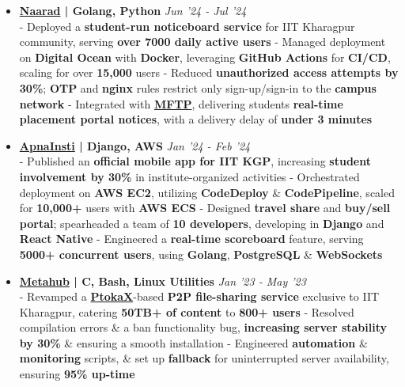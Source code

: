 \documentclass[a4paper,10pt]{extarticle} %
\begin{document}
\begin{itemize}[leftmargin=0.55cm, rightmargin=0.2cm, label={\Large\textbullet}]

 \item \textbf{\href{https://naarad.metakgp.org}{Naarad} | Golang, Python} \hfill{\textit{Jun '24 - Jul '24}} \\
- Deployed a \textbf{student-run noticeboard service} for IIT Kharagpur community, serving \textbf{over 7000 daily active users} \newline
- Managed deployment on \textbf{Digital Ocean} with \textbf{Docker}, leveraging \textbf{GitHub Actions} for \textbf{CI/CD}, scaling for over \textbf{15,000} users \newline
- Reduced \textbf{unauthorized access attempts by 30\%}; \textbf{OTP} and \textbf{nginx} rules restrict only sign-up/sign-in to the \textbf{campus network}  \newline
- Integrated with \href{https://github.com/metakgp/mftp}{\textbf{MFTP}}, delivering students \textbf{real-time placement portal notices}, with a delivery delay of \textbf{under 3 minutes}

 \item \textbf{{\href{https://play.google.com/store/apps/details?id=com.apnainsti&pli=1}{ApnaInsti}} | Django, AWS} \hfill{\textit{Jan '24 - Feb '24}} \\
- Published an \textbf{official mobile app for IIT KGP}, increasing \textbf{student involvement by 30\%} in institute-organized activities \newline
- Orchestrated deployment on \textbf{AWS EC2}, utilizing \textbf{CodeDeploy} \& \textbf{CodePipeline}, scaled for \textbf{10,000+} users with \textbf{AWS ECS} \newline
- Designed \textbf{travel share} and \textbf{buy/sell portal}; spearheaded a team of \textbf{10 developers}, developing in \textbf{Django} and \textbf{React Native} \newline
- Engineered a \textbf{real-time scoreboard} feature, serving \textbf{5000+ concurrent users}, using \textbf{Golang}, \textbf{PostgreSQL} \& \textbf{WebSockets}

\item \textbf{{\href{https://github.com/proffapt/Metahub}{Metahub}} | C, Bash, Linux Utilities} \hfill{\textit{Jan '23 - May '23}} \\
- Revamped a \href{http://www.ptokax.org/}{\textbf{PtokaX}}-based \textbf{P2P file-sharing service} exclusive to IIT Kharagpur, catering \textbf{50TB+ of content} to \textbf{800+ users} \newline
- Resolved compilation errors \& a ban functionality bug, \textbf{increasing server stability by 30\%} \& ensuring a smooth installation \newline
- Engineered \textbf{automation} \& \textbf{monitoring} scripts, \& set up \textbf{fallback} for uninterrupted server availability, ensuring \textbf{95\% up-time}


\end{itemize}
\end{document}
